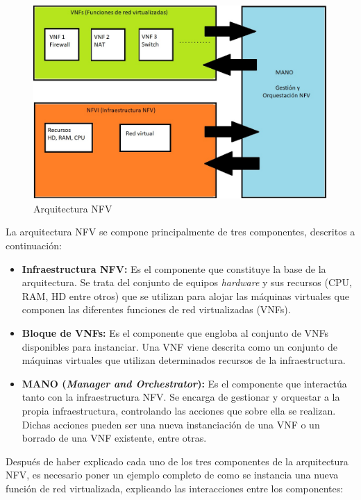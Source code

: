 \begin{figure}[!ht]
	\centering
	\includegraphics[width=0.75\linewidth]{imagenes/arquitectura_nfv}
	\caption{Arquitectura NFV}
	\label{fig:arquitecturanfv}
\end{figure}

La arquitectura NFV se compone principalmente de tres componentes, descritos a continuación:

\begin{itemize}
	\item \textbf{Infraestructura NFV:} Es el componente que constituye la base de la arquitectura. Se trata del conjunto de equipos \textit{hardware} y sus recursos (CPU, RAM, HD entre otros) que se utilizan para alojar las máquinas virtuales que componen las diferentes funciones de red virtualizadas (VNFs).
	
	\item \textbf{Bloque de VNFs:} Es el componente que engloba al conjunto de VNFs disponibles para instanciar. Una VNF viene descrita como un conjunto de máquinas virtuales que utilizan determinados recursos de la infraestructura.
	
	\item \textbf{MANO (\textit{Manager and Orchestrator}):} Es el componente que interactúa tanto con la infraestructura NFV. Se encarga de gestionar y orquestar a la propia infraestructura, controlando las acciones que sobre ella se realizan. Dichas acciones pueden ser una nueva instanciación de una VNF o un borrado de una VNF existente, entre otras.
	
\end{itemize}

Después de haber explicado cada uno de los tres componentes de la arquitectura NFV, es necesario poner un ejemplo completo de como se instancia una nueva función de red virtualizada, explicando las interacciones entre los componentes:

